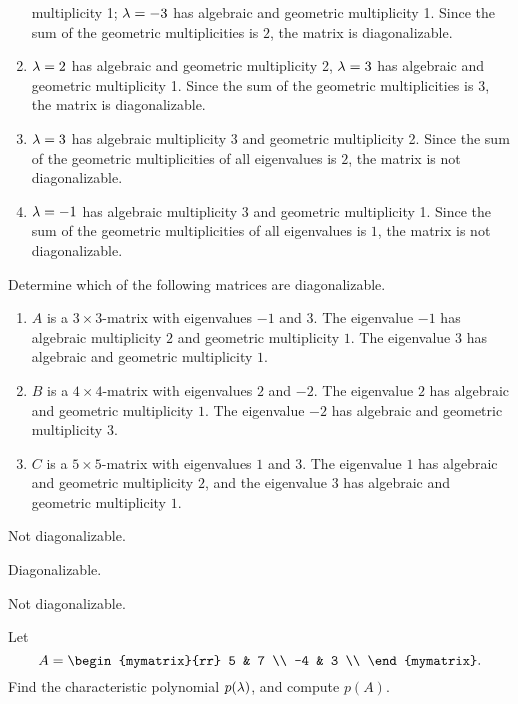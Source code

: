 \begin{enumialphparenastyle}
\begin{ex}
\begin{sol}
\begin{enumerate}
      multiplicity 1; $\lambda=-3$ has algebraic and geometric
      multiplicity 1. Since the sum of the geometric multiplicities is
      $2$, the matrix is diagonalizable.
    \item $\lambda=2$ has algebraic and geometric
      multiplicity 2, $\lambda=3$ has algebraic and geometric
      multiplicity 1. Since the sum of the geometric multiplicities is
      $3$, the matrix is diagonalizable.
    \item $\lambda=3$ has algebraic multiplicity 3 and geometric
      multiplicity 2. Since the sum of the geometric multiplicities of
      all eigenvalues is $2$, the matrix is not diagonalizable.
    \item $\lambda = -1$ has algebraic multiplicity 3 and geometric
      multiplicity 1. Since the sum of the geometric multiplicities of
      all eigenvalues is $1$, the matrix is not diagonalizable.
    \end{enumerate}
  \end{sol}
\end{ex}

\begin{ex}
  Determine which of the following matrices are diagonalizable.
  \begin{enumerate}
  \item $A$ is a $3\times 3$-matrix with eigenvalues $-1$ and $3$. The
    eigenvalue $-1$ has algebraic multiplicity $2$ and geometric
    multiplicity $1$. The eigenvalue $3$ has algebraic and geometric
    multiplicity $1$.
  \item $B$ is a $4\times 4$-matrix with eigenvalues $2$ and $-2$. The
    eigenvalue $2$ has algebraic and geometric multiplicity $1$. The
    eigenvalue $-2$ has algebraic and geometric multiplicity $3$.
  \item $C$ is a $5\times 5$-matrix with eigenvalues $1$ and $3$. The
    eigenvalue $1$ has algebraic and geometric multiplicity $2$, and
    the eigenvalue $3$ has algebraic and geometric multiplicity $1$.
  \end{enumerate}
  \begin{sol}
  \item Not diagonalizable.
  \item Diagonalizable.
  \item Not diagonalizable.
  \end{sol}
\end{ex}

\begin{ex}
  Let
  \begin{equation*}
    A = \begin{mymatrix}{rr}
      5 & 7 \\
      -4 & 3 \\
    \end{mymatrix}.
  \end{equation*}
  Find the characteristic polynomial $p(\lambda)$, and compute
  $p(A)$.
\end{ex}


\end{enumialphparenastyle}
